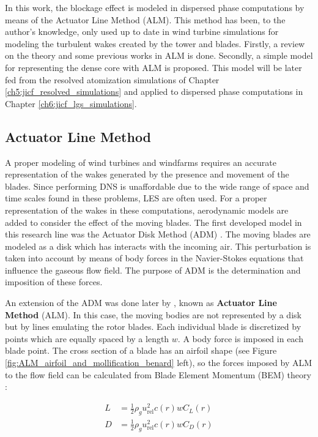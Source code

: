 In this work, the blockage effect is modeled in dispersed phase computations by means of the Actuator Line Method (ALM). This method has been, to the author's knowledge, only used up to date in wind turbine simulations for modeling the turbulent wakes created by the tower and blades. Firstly, a review on the theory and some previous works in ALM is done. Secondly, a simple model for representing the dense core with ALM is proposed. This model will be later fed from the resolved atomization simulations of Chapter \ref{ch5:jicf_resolved_simulations} and applied to dispersed phase computations in Chapter \ref{ch6:jicf_lgs_simulations}.


\subsection{Actuator Line Method}

A proper modeling of wind turbines and windfarms requires an accurate representation of the wakes generated by the presence and movement of the blades. Since performing DNS is unaffordable due to the wide range of space and time scales found in these problems, LES are often used. For a proper representation of the wakes in these computations, aerodynamic models are added to consider the effect of the moving blades. The first developed model in this research line was the Actuator Disk Method (ADM) . The moving blades are modeled as a disk which has interacts with the incoming air. This perturbation is taken into account by means of body forces in the Navier-Stokes equations that influence the gaseous flow field. The purpose of ADM is the determination and imposition of these forces.

An extension of the ADM was done later by , known as \textbf{Actuator Line Method} (ALM). In this case, the moving bodies are not represented by a disk but by lines emulating the rotor blades. Each individual blade is discretized by points which are equally spaced by a length $w$. A body force is imposed in each blade point. The cross section of a blade has an airfoil shape (see Figure \ref{fig:ALM_airfoil_and_mollification_benard} left), so the forces imposed by ALM to the flow field can be calculated from Blade Element Momentum (BEM) theory :

\begin{subequations}
\label{eq:ALM_lift_drag_definitions}
\begin{align}
L &= \frac{1}{2} \rho_g u_\mathrm{rel}^2 c \left( r \right) w C_L \left( r \right) \\
D &= \frac{1}{2} \rho_g u_\mathrm{rel}^2 c \left( r \right) w C_D \left( r \right)
\end{align}
\end{subequations}


